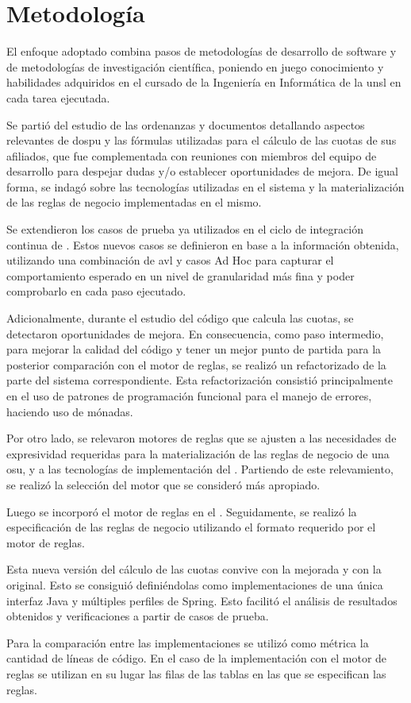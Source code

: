 \section{Metodología} \label{sec:metodologia}

El enfoque adoptado combina pasos de metodologías de desarrollo de software y de metodologías de investigación científica, poniendo en juego conocimiento y habilidades adquiridos en el cursado de la Ingeniería en Informática de la \acrshort{unsl} en cada tarea ejecutada.

Se partió del estudio de las ordenanzas y documentos detallando aspectos relevantes de \acrshort{dospu} y las fórmulas utilizadas para el cálculo de las cuotas de sus afiliados, que fue complementada con reuniones con miembros del equipo de desarrollo {\SIDOSPU} para despejar dudas y/o establecer oportunidades de mejora. 
De igual forma, se indagó sobre las tecnologías utilizadas en el sistema y la materialización de las reglas de negocio implementadas en el mismo.

Se extendieron los casos de prueba ya utilizados en el ciclo de integración continua de {\SIDOSPU}.
Estos nuevos casos se definieron en base a la información obtenida, utilizando una combinación de \acrfull{avl} y casos Ad Hoc para capturar el comportamiento esperado en un nivel de granularidad más fina y poder comprobarlo en cada paso ejecutado.

Adicionalmente, durante el estudio del código que calcula las cuotas, se detectaron oportunidades de mejora. 
En consecuencia, como paso intermedio, para mejorar la calidad del código y tener un mejor punto de partida para la posterior comparación con el motor de reglas, se realizó un refactorizado de la parte del sistema correspondiente. 
Esta refactorización consistió principalmente en el uso de patrones de programación funcional para el manejo de errores, haciendo uso de mónadas.

Por otro lado, se relevaron motores de reglas que se ajusten a las necesidades de expresividad requeridas para la materialización de las reglas de negocio de una \acrshort{osu}, y a las tecnologías de implementación del {\SIDOSPU}. 
Partiendo de este relevamiento, se realizó la selección del motor que se consideró más apropiado.

Luego se incorporó el motor de reglas en el {\SIDOSPU}.
Seguidamente, se realizó la especificación de las reglas de negocio utilizando el formato requerido por el motor de reglas.

Esta nueva versión del cálculo de las cuotas convive con la mejorada y con la original. 
Esto se consiguió definiéndolas como implementaciones de una única interfaz Java y múltiples perfiles de Spring. 
Esto facilitó el análisis de resultados obtenidos y verificaciones a partir de casos de prueba. 

Para la comparación entre las implementaciones se utilizó como métrica la cantidad de líneas de código.  
En el caso de la implementación con el motor de reglas se utilizan en su lugar las filas de las tablas en las que se especifican las reglas.
